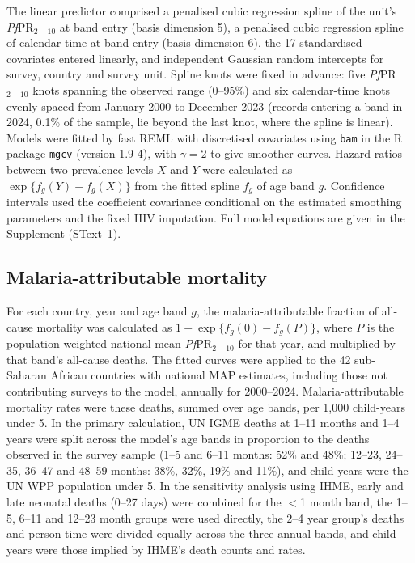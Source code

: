 The linear predictor comprised a penalised cubic regression spline of the unit's \textit{Pf}PR$_{2-10}$ at band entry (basis dimension 5), a penalised cubic regression spline of calendar time at band entry (basis dimension 6), the 17 standardised covariates entered linearly, and independent Gaussian random intercepts for survey, country and survey unit. Spline knots were fixed in advance: five \textit{Pf}PR$_{2-10}$ knots spanning the observed range (0--95\%) and six calendar-time knots evenly spaced from January 2000 to December 2023 (records entering a band in 2024, 0.1\% of the sample, lie beyond the last knot, where the spline is linear). Models were fitted by fast REML with discretised covariates using \texttt{bam} in the R package \texttt{mgcv} (version 1.9-4), with $\gamma = 2$ to give smoother curves. Hazard ratios between two prevalence levels $X$ and $Y$ were calculated as $\exp\{f_g(Y) - f_g(X)\}$ from the fitted spline $f_g$ of age band $g$. Confidence intervals used the coefficient covariance conditional on the estimated smoothing parameters and the fixed HIV imputation. Full model equations are given in the Supplement (SText~1).

\subsection*{Malaria-attributable mortality}

For each country, year and age band $g$, the malaria-attributable fraction of all-cause mortality was calculated as $1 - \exp\{f_g(0) - f_g(P)\}$, where $P$ is the population-weighted national mean \textit{Pf}PR$_{2-10}$ for that year, and multiplied by that band's all-cause deaths. The fitted curves were applied to the 42 sub-Saharan African countries with national MAP estimates, including those not contributing surveys to the model, annually for 2000--2024. Malaria-attributable mortality rates were these deaths, summed over age bands, per 1,000 child-years under 5. In the primary calculation, UN IGME deaths at 1--11 months and 1--4 years were split across the model's age bands in proportion to the deaths observed in the survey sample (1--5 and 6--11 months: 52\% and 48\%; 12--23, 24--35, 36--47 and 48--59 months: 38\%, 32\%, 19\% and 11\%), and child-years were the UN WPP population under 5. In the sensitivity analysis using IHME, early and late neonatal deaths (0--27 days) were combined for the $<$1 month band, the 1--5, 6--11 and 12--23 month groups were used directly, the 2--4 year group's deaths and person-time were divided equally across the three annual bands, and child-years were those implied by IHME's death counts and rates.

